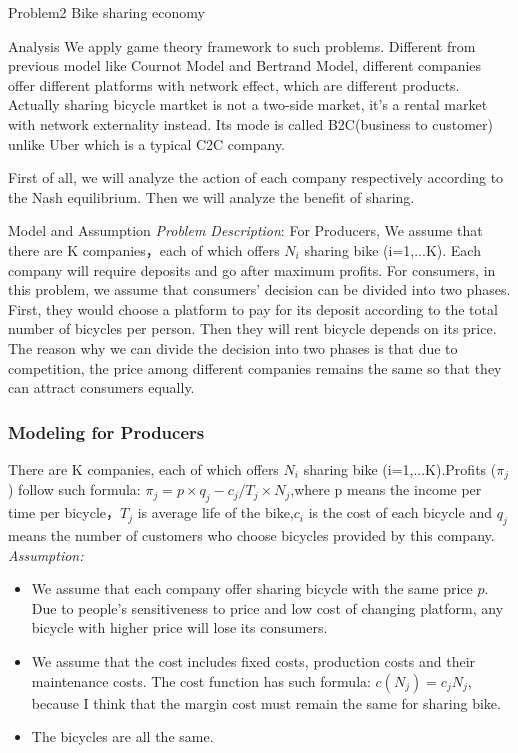 \documentclass[letterpaper,12pt]{article}
\begin{document}
\begin{section}{Problem2 Bike sharing economy}
	 \begin{subsection}{Analysis} 
	 \label{sub:name}
	 	We apply game theory framework to such problems. Different from previous model like Cournot Model and Bertrand Model, different companies offer different platforms with network effect, which are different products. Actually sharing bicycle martket is not a two-side market, it's a rental market with network externality instead. Its mode is called B2C(business to customer) unlike Uber which is a typical C2C company.

	 	First of all, we will analyze the action of each company respectively according to the Nash equilibrium. Then we will analyze the benefit of sharing.
	 \end{subsection}
	 
	 \begin{subsection}{Model and Assumption}
	 	\emph{Problem Description}: For Producers, We assume that there are K companies，each of which offers $N_i$ sharing bike (i=1,...K). Each company will require deposits and go after maximum profits.
	 	For consumers, in this problem, we assume that consumers' decision can be divided into two phases. First, they would choose a platform to pay for its deposit according to the total number of bicycles per person. Then they will rent bicycle depends on its price. The reason why we can divide the decision into two phases is that due to competition, the price among different companies remains the same so that they can attract consumers equally.

	 	\subsubsection{Modeling for Producers}
	 		There are K companies, each of which offers $N_i$ sharing bike (i=1,...K).Profits ($\pi_j$) follow such formula: $\pi_j=p\times q_j - c_j/T_j\times N_j$,where p means the income per time per bicycle，$T_j$ is average life of the bike,$c_i$ is the cost of each bicycle and $q_j$ means the number of customers who choose bicycles provided by this company.\\
	 		\emph{Assumption:}
	 			\begin{itemize}
	 				\item We assume that each company offer sharing bicycle with the same price $p$. Due to people's sensitiveness to price and low cost of changing platform, any bicycle with higher price will lose its consumers. 
	 				\item We assume that the cost includes fixed costs, production costs and their maintenance costs. The cost function has such formula: $c(N_j)= c_jN_j$, because I think that the margin cost must remain the same for sharing bike.
	 				\item The bicycles are all the same. 
	 			\end{itemize}  

\end{subsection}
\end{section}
\end{document}
